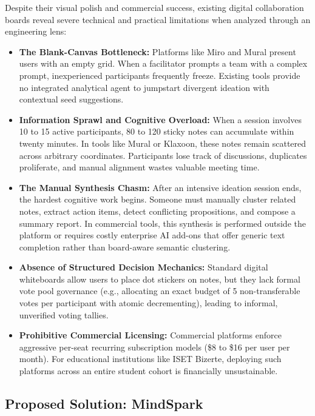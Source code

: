 Despite their visual polish and commercial success, existing digital collaboration boards reveal severe technical and practical limitations when analyzed through an engineering lens:

\begin{itemize}[leftmargin=1.5em]
    \item \textbf{The Blank-Canvas Bottleneck:} Platforms like Miro and Mural present users with an empty grid. When a facilitator prompts a team with a complex prompt, inexperienced participants frequently freeze. Existing tools provide no integrated analytical agent to jumpstart divergent ideation with contextual seed suggestions.
    \item \textbf{Information Sprawl and Cognitive Overload:} When a session involves 10 to 15 active participants, 80 to 120 sticky notes can accumulate within twenty minutes. In tools like Mural or Klaxoon, these notes remain scattered across arbitrary coordinates. Participants lose track of discussions, duplicates proliferate, and manual alignment wastes valuable meeting time.
    \item \textbf{The Manual Synthesis Chasm:} After an intensive ideation session ends, the hardest cognitive work begins. Someone must manually cluster related notes, extract action items, detect conflicting propositions, and compose a summary report. In commercial tools, this synthesis is performed outside the platform or requires costly enterprise AI add-ons that offer generic text completion rather than board-aware semantic clustering.
    \item \textbf{Absence of Structured Decision Mechanics:} Standard digital whiteboards allow users to place dot stickers on notes, but they lack formal vote pool governance (e.g., allocating an exact budget of 5 non-transferable votes per participant with atomic decrementing), leading to informal, unverified voting tallies.
    \item \textbf{Prohibitive Commercial Licensing:} Commercial platforms enforce aggressive per-seat recurring subscription models (\$8 to \$16 per user per month). For educational institutions like ISET Bizerte, deploying such platforms across an entire student cohort is financially unsustainable.
\end{itemize}

\subsection{Proposed Solution: MindSpark}
\label{subsec:proposed_solution}

